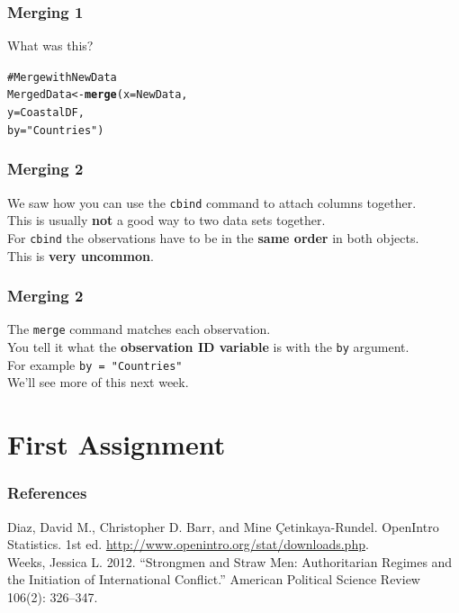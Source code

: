 \documentclass{beamer}\usepackage{graphicx, color}
\makeatletter
\newcommand{\hlfunctioncall}[1]{\textcolor[rgb]{0.501960784313725,0,0.329411764705882}{\textbf{#1}}}%
\newcommand{\hlstring}[1]{\textcolor[rgb]{0.6,0.6,1}{#1}}%
\newcommand{\hlcomment}[1]{\textcolor[rgb]{0.180392156862745,0.6,0.341176470588235}{#1}}%
\newenvironment{kframe}{%
 \def\at@end@of@kframe{}%
 \ifinner\ifhmode%
  \def\at@end@of@kframe{\end{minipage}}%
  \begin{minipage}{\columnwidth}%
 \fi\fi%
 \def\FrameCommand##1{\hskip\@totalleftmargin \hskip-\fboxsep
 \colorbox{shadecolor}{##1}\hskip-\fboxsep
     \hskip-\linewidth \hskip-\@totalleftmargin \hskip\columnwidth}%
 \MakeFramed {\advance\hsize-\width
   \@totalleftmargin\z@ \linewidth\hsize
   \@setminipage}}%
 {\par\unskip\endMakeFramed%
 \at@end@of@kframe}
\newenvironment{knitrout}{}{} %
\makeatother
\begin{document}
\begin{frame}[fragile]
  \frametitle{Merging 1}
  What was this?
\begin{knitrout}
\color{fgcolor}\begin{kframe}
\begin{alltt}
\hlcomment{# Merge with NewData}
MergedData <- \hlfunctioncall{merge}(x = NewData, 
                    y = CoastalDF, 
                    by = \hlstring{"Countries"})
\end{alltt}
\end{kframe}
\end{knitrout}

\end{frame}

\begin{frame}[fragile]
  \frametitle{Merging 2}
  We saw how you can use the \texttt{cbind} command to attach columns together. \\[0.5cm]
  This is usually {\bf{not}} a good way to two data sets together. \\[0.5cm]
  For \texttt{cbind} the observations have to be in the {\bf{same order}} in both objects. \\[0.5cm]
  This is {\bf{very uncommon}}.
\end{frame}

\begin{frame}[fragile]
  \frametitle{Merging 2}
  The \texttt{merge} command matches each observation.\\[0.5cm]
  You tell it what the {\bf{observation ID variable}} is with the \texttt{by} argument.\\[0.25cm]
  For example \texttt{by = "Countries"} \\[0.5cm]
  We'll see more of this next week.
\end{frame}


\section{First Assignment}

\begin{frame}[allowframebreaks]
  \frametitle{References}
  Diaz, David M., Christopher D. Barr, and Mine \c{C}etinkaya-Rundel. OpenIntro Statistics. 1st ed. \url{http://www.openintro.org/stat/downloads.php}. \\[0.25cm] 
  
  Weeks, Jessica L. 2012. “Strongmen and Straw Men: Authoritarian Regimes and the Initiation of International Conflict.” American Political Science Review 106(2): 326–347.
\end{frame}
\end{document}
